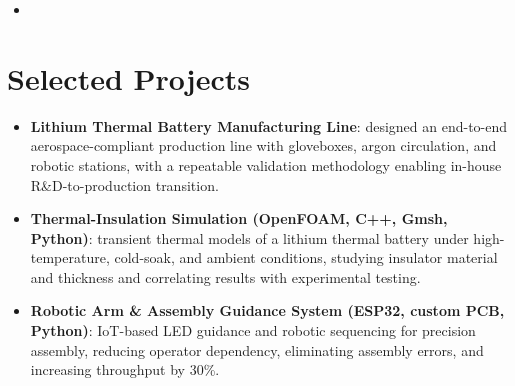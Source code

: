 \documentclass[11pt,a4paper,sans]{moderncv}
\begin{document}
\begin{itemize}
\vspace{3pt}

\item{}

\end{itemize}


\section{Selected Projects}
\vspace{1pt}
\begin{itemize}

\item \textbf{Lithium Thermal Battery Manufacturing Line}: designed an end-to-end aerospace-compliant production line with gloveboxes, argon circulation, and robotic stations, with a repeatable validation methodology enabling in-house R\&D-to-production transition.

\item \textbf{Thermal-Insulation Simulation (OpenFOAM, C++, Gmsh, Python)}: transient thermal models of a lithium thermal battery under high-temperature, cold-soak, and ambient conditions, studying insulator material and thickness and correlating results with experimental testing.

\item \textbf{Robotic Arm \& Assembly Guidance System (ESP32, custom PCB, Python)}: IoT-based LED guidance and robotic sequencing for precision assembly, reducing operator dependency, eliminating assembly errors, and increasing throughput by 30\%.

\end{itemize}
\end{document}
